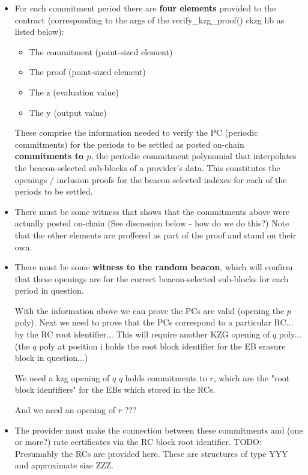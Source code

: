 \documentclass{article}
\begin{document}
\begin{itemize}
    \item For each commitment period there are \textbf{four elements} provided to the contract (corresponding to the args of the verify\_kzg\_proof() ckzg lib as listed below):
    \begin{itemize}
        \item The commitment (point-sized element)
        \item The proof (point-sized element)
        \item The z (evaluation value) 
        \item The y (output value)
    \end{itemize}

These comprise the information needed to verify the PC (periodic commitments) for the periods to be settled as posted on-chain  \textbf{commitments to $p$}, the periodic commitment polynomial that interpolates the beacon-selected sub-blocks of a provider’s data.  This constitutes the openings / inclusion proofs for the beacon-selected indexes for each of the periods to be settled.

    \item There must be some witness that shows that the commitments above were actually posted on-chain (See discussion below - how do we do this?)   Note that the other elements are proffered as part of the proof and stand on their own.

    \item There must be some \textbf{witness to the random beacon}, which will confirm that these openings are for the correct beacon-selected sub-blocks for each period in question.

With the information above we can prove the PCs are valid (opening the $p$ poly).  Next we need to prove that the PCs correspond to a particular RC... by the RC root identifier... This will require another KZG opening of $q$ poly... (the $q$ poly at position i holds the root block identifier for the EB erasure block in question...)

We need a kzg opening of $q$
$q$ holds commitments to $r$, which are the "root block identifiers" for the EBs which stored in the RCs.

And we need an opening of $r$ ???

    \item The provider must make the connection between these commitments and (one or more?) rate certificates via the RC block root identifier. TODO: Presumably the RCs are provided here.  These are structures of type YYY and approximate size ZZZ.
\end{itemize}
\end{document}
